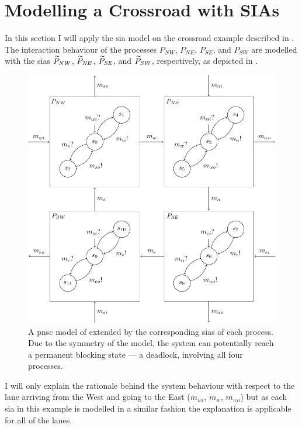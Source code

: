\section{Modelling a Crossroad with SIAs}
\label{sect_ecm_example}
In this section I will apply the \gls{sia} model on the crossroad example described in \Fig{\ref{fig_cross_proc_dl}}.
The interaction behaviour of the processes $P_{\mathit{NW}}$, $P_{\mathit{NE}}$, $P_{\mathit{SE}}$, and $P_{\mathit{SW}}$ are modelled with the \glspl{sia} $\widetilde{P}_{\mathit{NW}}$, $\widetilde{P}_{\mathit{NE}}$, $\widetilde{P}_{\mathit{SE}}$, and $\widetilde{P}_{\mathit{SW}}$, respectively, as depicted in \Fig{\ref{fig_cross_proc_sia_dl}}.
\begin{figure}[bht]
    \TopFigSpace
    \centering
    \includegraphics[width=12cm]{fig/cross_proc_sia_dl.pdf}
    \CaptionFigSpace
    \caption{A \gls{pnsc} model of \Fig{\ref{fig_cross_proc_dl}} extended by the corresponding \glspl{sia} of each process.
        Due to the symmetry of the model, the system can potentially reach a permanent blocking state --- a deadlock, involving all four processes.}
    \label{fig_cross_proc_sia_dl}
    \BotFigSpace
\end{figure}
I will only explain the rationale behind the system behaviour with respect to the lane arriving from the West and going to the East ($m_{wi}$, $m_{w}$, $m_{wo}$) but as each \gls{sia} in this example is modelled in a similar fashion the explanation is applicable for all of the lanes.
